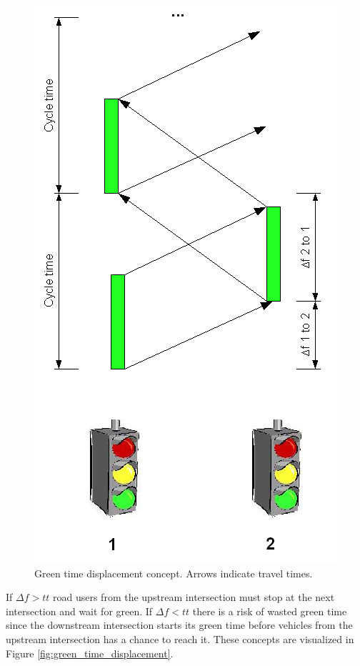 \begin{figure}[htbp]
\centering
\includegraphics[scale=0.35]{green_time_displacement_and_cycle_time.png}
\caption{Green time displacement concept. Arrows indicate travel times.}
\label{fig:green_time_displacement_concept}
\end{figure}

If $\Delta f > tt$ road users from the upstream intersection must stop at the next intersection and wait for green. If $\Delta f < tt$ there is a risk of wasted green time since the downstream intersection starts its green time before vehicles from the upstream intersection has a chance to reach it. These concepts are visualized in Figure \ref{fig:green_time_displacement}. 

